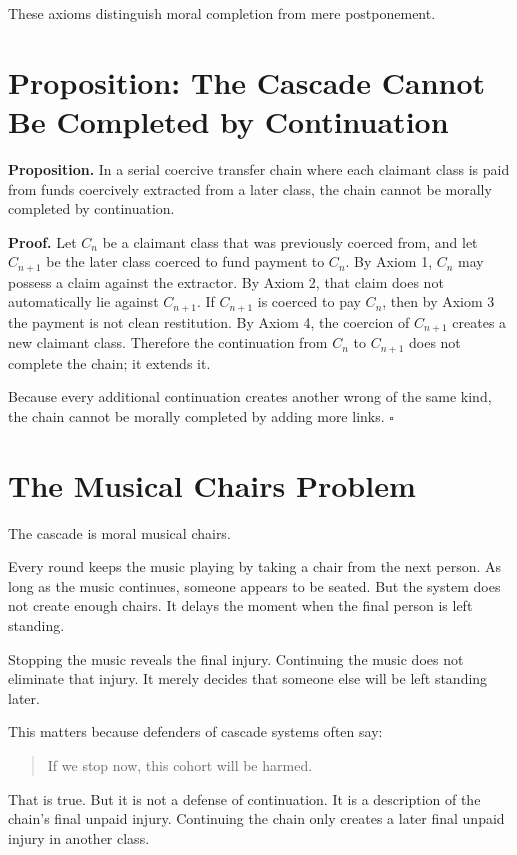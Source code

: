 \documentclass[12pt]{article}
\begin{document}
These axioms distinguish moral completion from mere postponement.

\section{Proposition: The Cascade Cannot Be Completed by Continuation}

\textbf{Proposition.} In a serial coercive transfer chain where each claimant class is paid from funds coercively extracted from a later class, the chain cannot be morally completed by continuation.

\textbf{Proof.} Let \(C_n\) be a claimant class that was previously coerced from, and let \(C_{n+1}\) be the later class coerced to fund payment to \(C_n\). By Axiom 1, \(C_n\) may possess a claim against the extractor. By Axiom 2, that claim does not automatically lie against \(C_{n+1}\). If \(C_{n+1}\) is coerced to pay \(C_n\), then by Axiom 3 the payment is not clean restitution. By Axiom 4, the coercion of \(C_{n+1}\) creates a new claimant class. Therefore the continuation from \(C_n\) to \(C_{n+1}\) does not complete the chain; it extends it.

Because every additional continuation creates another wrong of the same kind, the chain cannot be morally completed by adding more links. \(\square\)

\section{The Musical Chairs Problem}

The cascade is moral musical chairs.

Every round keeps the music playing by taking a chair from the next person. As long as the music continues, someone appears to be seated. But the system does not create enough chairs. It delays the moment when the final person is left standing.

Stopping the music reveals the final injury. Continuing the music does not eliminate that injury. It merely decides that someone else will be left standing later.

This matters because defenders of cascade systems often say:

\begin{quote}
If we stop now, this cohort will be harmed.
\end{quote}

That is true. But it is not a defense of continuation. It is a description of the chain's final unpaid injury. Continuing the chain only creates a later final unpaid injury in another class.
\end{document}

